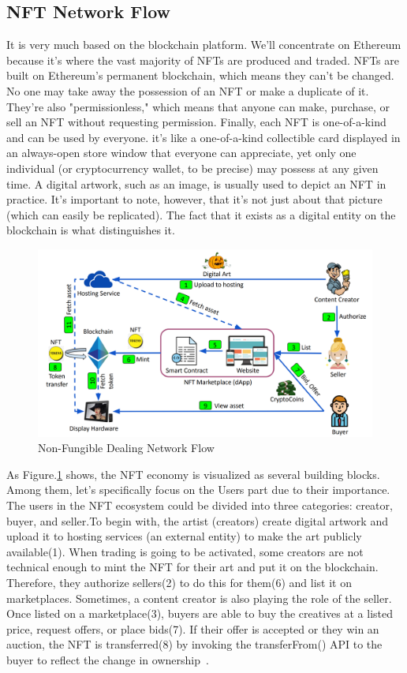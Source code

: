 \subsection{NFT Network Flow}
It is very much based on the blockchain platform. We'll concentrate on Ethereum because it's where the vast majority of NFTs are produced and traded. NFTs are built on Ethereum's permanent blockchain, which means they can't be changed. No one may take away the possession of an NFT or make a duplicate of it. They're also "permissionless," which means that anyone can make, purchase, or sell an NFT without requesting permission. Finally, each NFT is one-of-a-kind and can be used by everyone. it's like a one-of-a-kind collectible card displayed in an always-open store window that everyone can appreciate, yet only one individual (or cryptocurrency wallet, to be precise) may possess at any given time. A digital artwork, such as an image, is usually used to depict an NFT in practice. It's important to note, however, that it's not just about that picture (which can easily be replicated). The fact that it exists as a digital entity on the blockchain is what distinguishes it.

\begin{figure}[tp]
\includegraphics[width=1\textwidth]{Figure/Network Flow.jpg}
\caption{\label{fig:Network}Non-Fungible Dealing Network Flow}
\end{figure}

As Figure.\ref{fig:Network} shows, the NFT economy is visualized as several building blocks. Among them, let’s specifically focus on the Users part due to their importance. 
The users in the NFT ecosystem could be divided into three categories: creator, buyer, and seller.To begin with, the artist (creators) create digital artwork and upload it to hosting services (an external entity) to make the art publicly available(1). When trading is going to be activated, some creators are not technical enough to mint the NFT for their art and put it on the blockchain. Therefore, they authorize sellers(2) to do this for them(6) and list it on marketplaces. Sometimes, a content creator is also playing the role of the seller. Once listed on a marketplace(3), buyers are able to buy the creatives at a listed price, request offers, or place bids(7). If their offer is accepted or they win an auction, the NFT is transferred(8) by invoking the transferFrom() API to the buyer to reflect the change in ownership~\cite{das2022understanding}.

